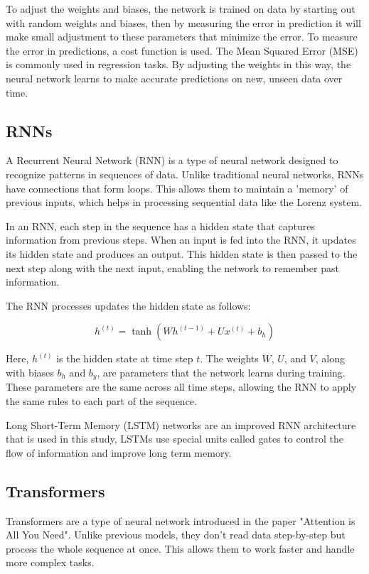 \documentclass[11pt]{article}
\begin{document}
To adjust the weights and biases, the network is trained on data by starting out with random weights and biases, then by measuring the error in prediction it will make small adjustment to these parameters that minimize the error. To measure the error in predictions, a cost function is used. The Mean Squared Error (MSE) is commonly used in regression tasks. By adjusting the weights in this way, the neural network learns to make accurate predictions on new, unseen data over time.


\subsection{RNNs}

A Recurrent Neural Network (RNN) is a type of neural network designed to recognize patterns in sequences of data. Unlike traditional neural networks, RNNs have connections that form loops. This allows them to maintain a 'memory' of previous inputs, which helps in processing sequential data like the Lorenz system.

In an RNN, each step in the sequence has a hidden state that captures information from previous steps. When an input is fed into the RNN, it updates its hidden state and produces an output. This hidden state is then passed to the next step along with the next input, enabling the network to remember past information.

The RNN processes updates the hidden state as follows:

\begin{equation}
h^{(t)} = \tanh(Wh^{(t-1)} + Ux^{(t)} + b_h)
\end{equation}

Here, \(h^{(t)}\) is the hidden state at time step \(t\). The weights \(W\), \(U\), and \(V\), along with biases \(b_h\) and \(b_y\), are parameters that the network learns during training. These parameters are the same across all time steps, allowing the RNN to apply the same rules to each part of the sequence.

Long Short-Term Memory (LSTM) networks are an improved RNN architecture that is used in this study,  LSTMs use special units called gates to control the flow of information and improve long term memory.


\subsection{Transformers}
Transformers are a type of neural network introduced in the paper "Attention is All You Need". Unlike previous models, they don't read data step-by-step but process the whole sequence at once. This allows them to work faster and handle more complex tasks.
\end{document}
